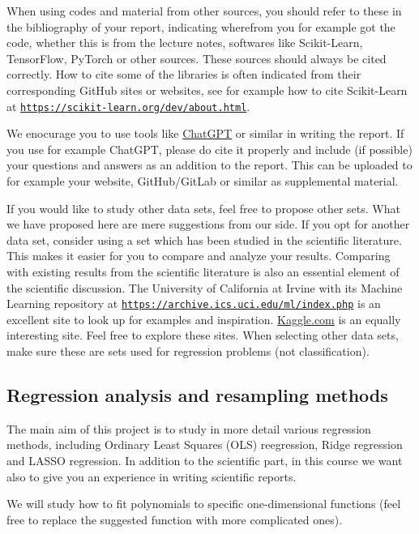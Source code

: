 \documentclass[%
oneside,                 %
final,                   %
10pt]{article}
\begin{document}
When using codes and material from other sources, you should refer to
these in the bibliography of your report, indicating wherefrom you for
example got the code, whether this is from the lecture notes,
softwares like Scikit-Learn, TensorFlow, PyTorch or other sources. These sources
should always be cited correctly. How to cite some
of the libraries is often indicated from their corresponding GitHub
sites or websites, see for example how to cite Scikit-Learn at
\href{{https://scikit-learn.org/dev/about.html}}{\nolinkurl{https://scikit-learn.org/dev/about.html}}.

We enocurage you to use tools like
\href{{https://openai.com/chatgpt/}}{ChatGPT} or similar in writing the report. If you use for example ChatGPT,
please do cite it properly and include (if possible) your questions and answers as an addition to the report. This can
be uploaded to for example your website, GitHub/GitLab or similar as supplemental material.

If you would like to study other data sets, feel free to propose other
sets. What we have proposed here are mere suggestions from our
side. If you opt for another data set, consider using a set which has
been studied in the scientific literature. This makes it easier for
you to compare and analyze your results. Comparing with existing
results from the scientific literature is also an essential element of
the scientific discussion.  The University of California at Irvine
with its Machine Learning repository at
\href{{https://archive.ics.uci.edu/ml/index.php}}{\nolinkurl{https://archive.ics.uci.edu/ml/index.php}} is an excellent site to
look up for examples and
inspiration. \href{{https://www.kaggle.com/}}{Kaggle.com} is an equally
interesting site. Feel free to explore these sites. When selecting
other data sets, make sure these are sets used for regression problems
(not classification).

\subsection{Regression analysis and resampling methods}

The main aim of this project is to study in more detail various
regression methods, including Ordinary Least Squares (OLS) reegression, Ridge regression and LASSO regression.
In addition to the scientific part, in this course we want also to
give you an experience in writing scientific reports.

We will study how to fit polynomials to specific
one-dimensional functions (feel free to replace the suggested function with more complicated ones).
\end{document}
